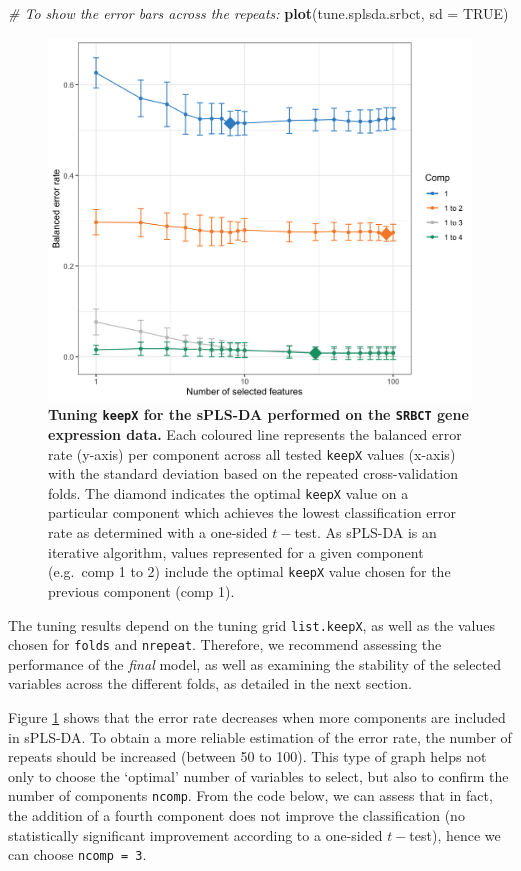 \documentclass[]{book}
\newenvironment{Shaded}{\begin{snugshade}}{\end{snugshade}}
\newcommand{\CommentTok}[1]{\textcolor[rgb]{0.56,0.35,0.01}{\textit{#1}}}
\newcommand{\DataTypeTok}[1]{\textcolor[rgb]{0.13,0.29,0.53}{#1}}
\newcommand{\KeywordTok}[1]{\textcolor[rgb]{0.13,0.29,0.53}{\textbf{#1}}}
\newcommand{\NormalTok}[1]{#1}
\newcommand{\OtherTok}[1]{\textcolor[rgb]{0.56,0.35,0.01}{#1}}
\begin{document}
\begin{Shaded}
\begin{Highlighting}[]
\CommentTok{# To show the error bars across the repeats:}
\KeywordTok{plot}\NormalTok{(tune.splsda.srbct, }\DataTypeTok{sd =} \OtherTok{TRUE}\NormalTok{)}
\end{Highlighting}
\end{Shaded}

\begin{figure}

{\centering \includegraphics[width=0.5\linewidth]{Figures/PLSDA/splsda-tune-1} 

}

\caption{\textbf{Tuning \texttt{keepX} for the sPLS-DA performed on the \texttt{SRBCT} gene expression data.} Each coloured line represents the balanced error rate (y-axis) per component across all tested \texttt{keepX} values (x-axis) with the standard deviation based on the repeated cross-validation folds. The diamond indicates the optimal \texttt{keepX} value on a particular component which achieves the lowest classification error rate as determined with a one-sided \(t-\)test. As sPLS-DA is an iterative algorithm, values represented for a given component (e.g.~comp 1 to 2) include the optimal \texttt{keepX} value chosen for the previous component (comp 1).}\label{fig:splsda-tune}
\end{figure}



The tuning results depend on the tuning grid \texttt{list.keepX}, as well as the values chosen for \texttt{folds} and \texttt{nrepeat}. Therefore, we recommend assessing the performance of the \emph{final} model, as well as examining the stability of the selected variables across the different folds, as detailed in the next section.

Figure \ref{fig:splsda-tune} shows that the error rate decreases when more components are included in sPLS-DA. To obtain a more reliable estimation of the error rate, the number of repeats should be increased (between 50 to 100). This type of graph helps not only to choose the `optimal' number of variables to select, but also to confirm the number of components \texttt{ncomp}. From the code below, we can assess that in fact, the addition of a fourth component does not improve the classification (no statistically significant improvement according to a one-sided \(t-\)test), hence we can choose \texttt{ncomp\ =\ 3}.
\end{document}
